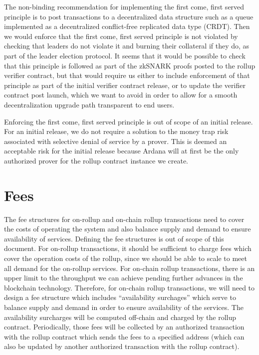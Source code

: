 \documentclass[12pt]{article}
\begin{document}
The non-binding recommendation for implementing the first come, first served principle is to post transactions to a decentralized data structure such as a queue implemented as a decentralized conflict-free replicated data type (CRDT). Then we would enforce that the first come, first served principle is not violated by checking that leaders do not violate it and burning their collateral if they do, as part of the leader election protocol. It seems that it would be possible to check that this principle is followed as part of the zkSNARK proofs posted to the rollup verifier contract, but that would require us either to include enforcement of that principle as part of the initial verifier contract release, or to update the verifier contract post launch, which we want to avoid in order to allow for a smooth decentralization upgrade path transparent to end users.

Enforcing the first come, first served principle is out of scope of an initial release. For an initial release, we do not require a solution to the money trap risk associated with selective denial of service by a prover. This is deemed an acceptable risk for the initial release because Ardana will at first be the only authorized prover for the rollup contract instance we create.


\section{Fees}

The fee structures for on-rollup and on-chain rollup transactions need to cover the costs of operating the system and also balance supply and demand to ensure availability of services. Defining the fee structures is out of scope of this document. For on-rollup transactions, it should be sufficient to charge fees which cover the operation costs of the rollup, since we should be able to scale to meet all demand for the on-rollup services. For on-chain rollup transactions, there is an upper limit to the throughput we can achieve pending further advances in the blockchain technology. Therefore, for on-chain rollup transactions, we will need to design a fee structure which includes ``availability surchages'' which serve to balance supply and demand in order to ensure availability of the services. The availability surcharges will be computed off-chain and charged by the rollup contract. Periodically, those fees will be collected by an authorized transaction with the rollup contract which sends the fees to a specified address (which can also be updated by another authorized transaction with the rollup contract).
\end{document}
